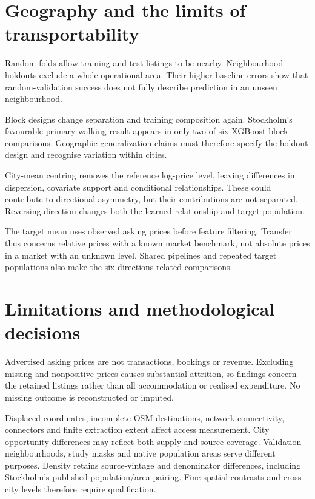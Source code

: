\documentclass[11pt,a4paper,oneside,openany]{memoir}
\begin{document}
\section{Geography and the limits of transportability}
\label{sec:discussion-geography}
Random folds allow training and test listings to be nearby. Neighbourhood
holdouts exclude a whole operational area. Their higher baseline errors show
that random-validation success does not fully describe prediction in an
unseen neighbourhood.

Block designs change separation and training composition again. Stockholm's
favourable primary walking result appears in only two of six XGBoost block
comparisons. Geographic generalization claims must therefore specify the
holdout design and recognise variation within cities.

City-mean centring removes the reference log-price level, leaving differences
in dispersion, covariate support and conditional relationships. These could
contribute to directional asymmetry, but their contributions are not separated.
Reversing direction changes both the learned relationship and target population.

The target mean uses observed asking prices before feature filtering. Transfer
thus concerns relative prices with a known market benchmark, not absolute prices
in a market with an unknown level. Shared pipelines and repeated target
populations also make the six directions related comparisons.

\section{Limitations and methodological decisions}
\label{sec:limitations}
Advertised asking prices are not transactions, bookings or revenue. Excluding
missing and nonpositive prices causes substantial attrition, so findings concern
the retained listings rather than all accommodation or realised expenditure.
No missing outcome is reconstructed or imputed.

Displaced coordinates, incomplete OSM destinations, network connectivity,
connectors and finite extraction extent affect access measurement. City
opportunity differences may reflect both supply and source coverage. Validation
neighbourhoods, study masks and native population areas serve different purposes.
Density retains source-vintage and denominator differences, including Stockholm's
published population/area pairing. Fine spatial contrasts and cross-city levels
therefore require qualification.
\end{document}
